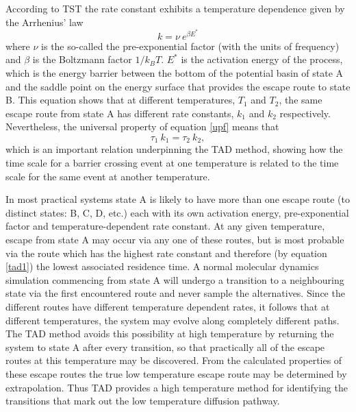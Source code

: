 According to TST the rate constant exhibits a temperature dependence
given by the Arrhenius' law
\begin{equation}
k=\nu~e^{\beta E^{*}} \label{arrhenius}
\end{equation}
where $\nu$ is the so-called the pre-exponential factor (with the
units of frequency) and $\beta $ is the Boltzmann factor $1/k_B T$.
$E^{*}$ is the activation energy of the process, which
is the energy barrier between the bottom of the potential basin of
state A and the saddle point on the energy surface
that provides the escape route to state B. This equation shows that at
different temperatures, $T_1$ and $T_2$, the same escape route from
state A has different rate constants, $k_1$ and $k_2$
respectively. Nevertheless, the universal property of equation
\ref{upf} means that
\begin{equation}
\tau_1~k_1=\tau_2~k_2, \label{tad1}
\end{equation}
which is an important relation underpinning the TAD method, showing
how the time scale for a barrier crossing event at one temperature is
related to the time scale for the same event at another temperature.

In most practical systems state A is likely to have more than one escape route
(to distinct states: B, C, D, etc.) each with its own activation energy,
pre-exponential factor and temperature-dependent rate constant. At any given
temperature, escape from state A may occur via any one of these routes, but is
most probable via the route which has the highest rate constant and therefore
(by equation \ref{tad1}) the lowest associated residence time. A normal
molecular dynamics simulation commencing from state A will undergo a
transition to a neighbouring state via the first encountered route and never
sample the alternatives. Since the different routes have different temperature
dependent rates, it follows that at different temperatures, the system may
evolve along completely different paths. The TAD method avoids this
possibility at high temperature by returning the system to state A after every
transition, so that practically all of the escape routes at this temperature
may be discovered. From the calculated properties of these escape routes the
true low temperature escape route may be determined by extrapolation. Thus TAD
provides a high temperature method for identifying the transitions that mark
out the low temperature diffusion pathway.

